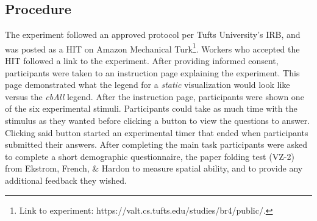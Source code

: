 \subsection{Procedure}
The experiment followed an approved protocol per Tufts University's IRB, and was posted as a HIT on Amazon Mechanical Turk\footnote{Link to experiment: https://valt.cs.tufts.edu/studies/br4/public/.}. Workers who accepted the HIT followed a link to the experiment. After providing informed consent, participants were taken to an instruction page explaining the experiment.
This page demonstrated what the legend for a \textit{static} visualization would look like versus the \textit{cbAll} legend. After the instruction page, participants were shown one of the six experimental stimuli. Participants could take as much time with the stimulus as they wanted before clicking a button to view the questions to answer. 
Clicking said button started an experimental timer that ended when participants submitted their answers.
After completing the main task participants were asked to complete a short demographic questionnaire, the paper folding test (VZ-2) from Ekstrom, French, \& Hardon\cite{paperFolding} to measure spatial ability, and to provide any additional feedback they wished. 

\begin{table}[t!]
\caption{Sample sizes (N) for each condition.}
\label{tab:pilotN}
\end{table}



